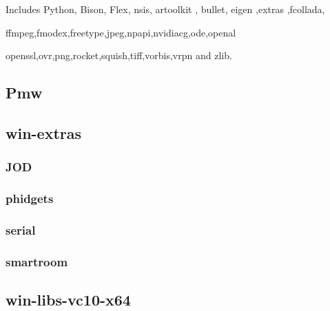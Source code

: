 \documentclass[a4paper]{article}
\begin{document}
{\centering\color{black}
Includes Python, Bison, Flex, nsis, artoolkit , bullet, eigen ,extras ,fcollada,
\par}

{\centering\color{black}
ffmpeg,fmodex,freetype,jpeg,npapi,nvidiacg,ode,openal
\par}

{\centering\color{black}
openssl,ovr,png,rocket,squish,tiff,vorbis,vrpn and zlib.
\par}

\clearpage\subsection[Pmw]{Pmw}
\hypertarget{RefHeading24091167907073}{}\clearpage\subsection[win{}-extras]{win-extras}
\hypertarget{RefHeading24111167907073}{}\clearpage\subsubsection[JOD]{JOD}
\hypertarget{RefHeading24131167907073}{}\subsubsection{}
\clearpage\subsubsection[phidgets]{phidgets}
\hypertarget{RefHeading24151167907073}{}\subsubsection{}
\clearpage\subsubsection[serial]{serial}
\hypertarget{RefHeading24171167907073}{}\subsubsection{}
\clearpage\subsubsection[smartroom]{smartroom}
\hypertarget{RefHeading24191167907073}{}\clearpage\subsection[win{}-libs{}-vc10{}-x64]{win-libs-vc10-x64}
\end{document}
